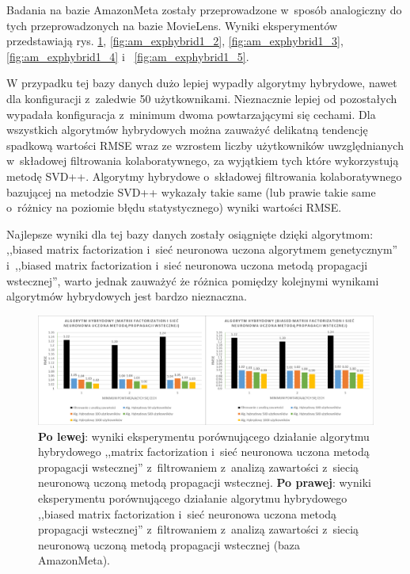 \documentclass[twoside]{iisthesis}
\begin{document}
		Badania na bazie AmazonMeta zostały przeprowadzone w~sposób analogiczny do tych przeprowadzonych na bazie MovieLens. Wyniki eksperymentów przedstawiają rys. \ref{fig:am_exphybrid1_1}, \ref{fig:am_exphybrid1_2}, \ref{fig:am_exphybrid1_3}, \ref{fig:am_exphybrid1_4} i~ \ref{fig:am_exphybrid1_5}.
		
		W przypadku tej bazy danych dużo lepiej wypadły algorytmy hybrydowe, nawet dla konfiguracji z~zaledwie 50 użytkownikami. Nieznacznie lepiej od pozostałych wypadała konfiguracja z~minimum dwoma powtarzającymi się cechami. Dla wszystkich algorytmów hybrydowych można zauważyć delikatną tendencję spadkową wartości RMSE wraz ze wzrostem liczby użytkowników uwzględnianych w~składowej filtrowania kolaboratywnego, za wyjątkiem tych które wykorzystują metodę SVD++. Algorytmy hybrydowe o~składowej filtrowania kolaboratywnego bazującej na metodzie SVD++ wykazały takie same (lub prawie takie same o~różnicy na poziomie błędu statystycznego) wyniki wartości RMSE.
		
		Najlepsze wyniki dla tej bazy danych zostały osiągnięte dzięki algorytmom: ,,biased matrix factorization i~sieć neuronowa uczona algorytmem genetycznym'' i~,,biased matrix factorization i~sieć neuronowa uczona metodą propagacji wstecznej'', warto jednak zauważyć że różnica pomiędzy kolejnymi wynikami algorytmów hybrydowych jest bardzo nieznaczna. 
		
		\begin{figure}
			\centering
			\includegraphics[width=1\textwidth]{am_exphybrid1_1}			
			\caption{\textbf{Po lewej}: wyniki eksperymentu porównującego działanie algorytmu hybrydowego ,,matrix factorization i~sieć neuronowa uczona metodą propagacji wstecznej'' z~filtrowaniem z~analizą zawartości z~siecią neuronową uczoną metodą propagacji wstecznej. \textbf{Po prawej}: wyniki eksperymentu porównującego działanie algorytmu hybrydowego ,,biased matrix factorization i~sieć neuronowa uczona metodą propagacji wstecznej'' z~filtrowaniem z~analizą zawartości z~siecią neuronową uczoną metodą propagacji wstecznej (baza AmazonMeta).}
			\label{fig:am_exphybrid1_1}
		\end{figure}
		
\end{document}
